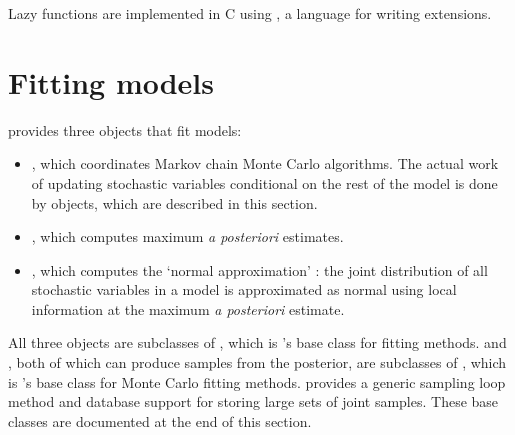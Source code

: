 \documentclass[]{jss}
\begin{document}
Lazy functions are implemented in C using  \citep{pyrex}, a language for writing  extensions.



\section[Fitting Models]{Fitting models}
\label{chap:modelfitting}

 provides three objects that fit models:
\begin{itemize}
    \item {}, which coordinates Markov chain Monte Carlo algorithms. The actual work of updating stochastic variables conditional on the rest of the model is done by  objects, which are described in this section.
    \item {}, which computes maximum \emph{a posteriori} estimates.
    \item {}, which computes the `normal approximation' \citep{gelman}: the joint distribution of all stochastic variables in a model is approximated as normal using local information at the maximum \emph{a posteriori} estimate.
\end{itemize}

All three objects are subclasses of , which is 's base class for fitting methods.  and , both of which can produce samples from the posterior, are subclasses of , which is 's base class for Monte Carlo fitting methods.  provides a generic sampling loop method and database support for storing large sets of joint samples. These base classes are documented at the end of this section. %
\end{document}
